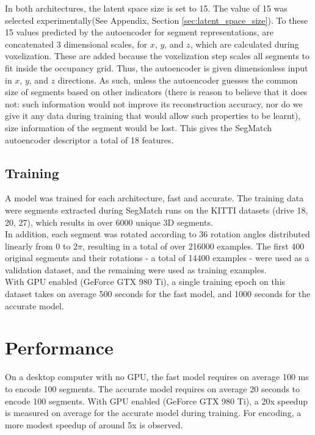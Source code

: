 In both architectures, the latent space size is set to 15. The value of 15 was selected experimentally(See Appendix, Section \ref{sec:latent_space_size}). To these 15 values predicted by the autoencoder for segment representations, are concatenated 3 dimensional scales, for $x$, $y$, and $z$, which are calculated during voxelization. These are added because the voxelization step scales all segments to fit inside the occupancy grid. Thus, the autoencoder is given dimensionless input in $x$, $y$, and $z$ directions. As such, unless the autoencoder guesses the common size of segments based on other indicators (there is reason to believe that it does not: such information would not improve its reconstruction accuracy, nor do we give it any data during training that would allow such properties to be learnt), size information of the segment would be lost. This gives the SegMatch autoencoder descriptor a total of 18 features.\\


\subsection{Training}
\label{subsec:ae-training}

A model was trained for each architecture, fast and accurate.  
The training data were segments extracted during SegMatch runs on the KITTI datasets (drive 18, 20, 27), which results in over 6000 unique 3D segments.\\

In addition, each segment was rotated according to 36 rotation angles distributed linearly from 0 to 2$\pi$, resulting in a total of over 216000 examples. The first 400 original segments and their rotations - a total of 14400 examples - were used as a validation dataset, and the remaining were used as training examples.\\

With GPU enabled (GeForce GTX 980 Ti), a single training epoch on this dataset takes on average 500 seconds for the fast model, and 1000 seconds for the accurate model.\\

\section{Performance}
\label{sec:ae-performance}

On a desktop computer with no GPU, the fast model requires on average 100 ms to encode 100 segments.
The accurate model requires on average 20 seconds to encode 100 segments. With GPU enabled (GeForce GTX 980 Ti), a 20x speedup is measured on average for the accurate model during training. For encoding, a more modest speedup of around 5x is observed.\\

